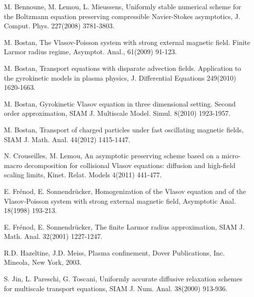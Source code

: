 \documentclass[12pt, a4paper]{article}
\begin{document}
\begin{thebibliography}{999}



 M. Bennoune, M. Lemou, L. Mieussens, Uniformly stable numerical scheme for the Boltzmann equation preserving compressible Navier-Stokes asymptotics, J. Comput. Phys. 227(2008) 3781-3803.


 M. Bostan, {The Vlasov-Poisson system with strong external magnetic field. Finite Larmor radius regime}, Asymptot. Anal., 61(2009) 91-123.


 {M. Bostan}, {Transport equations with disparate advection fields. Application to the gyrokinetic models in plasma physics}, J. Differential Equations 249(2010) 1620-1663.


 {M. Bostan}, {Gyrokinetic Vlasov equation in three dimensional setting. Second order approximation}, SIAM J. Multiscale Model. Simul. 8(2010) 1923-1957.


 {M. Bostan}, {Transport of charged particles under fast oscillating magnetic fields}, SIAM J. Math. Anal. 44(2012) 1415-1447.


 N. Crouseilles, M. Lemou, {An asymptotic preserving scheme based on a micro-macro decomposition for collisional Vlasov equations: diffusion and high-field scaling limits}, Kinet. Relat. Models 4(2011) 441-477.


 {E. Fr\'enod, E. Sonnendr\"ucker},
{Homogenization of the Vlasov equation and of the Vlasov-Poisson
system with strong external magnetic field}, Asymptotic Anal.
18(1998) 193-213.


 {E. Fr\'enod, E. Sonnendr\"ucker}, The finite
Larmor radius approximation, SIAM J. Math. Anal. 32(2001) 1227-1247.




 R.D. Hazeltine, J.D. Meiss, Plasma confinement, Dover Publications, Inc. Mineola, New York, 2003.


 S. Jin, L. Pareschi, G. Toscani, Uniformly accurate diffusive relaxation schemes for multiscale transport equations, SIAM J. Num. Anal. 38(2000) 913-936.



\end{thebibliography}
\end{document}
